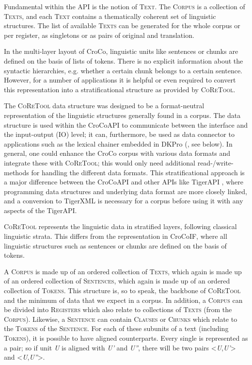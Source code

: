 \documentclass[output=paper]{LSP/langsci}
\begin{document}
Fundamental within the API is the notion of \textsc{Text}. The \textsc{Corpus} is a collection of \textsc{Texts}, and each \textsc{Text} contains a thematically coherent set of linguistic structures. The list of available \textsc{Texts} can be generated for the whole corpus or per register, as singletons or as pairs of original and translation.

In the multi-layer layout of CroCo, linguistic units like sentences or chunks are defined on the basis of lists of tokens. There is no explicit information about the syntactic hierarchies, e.g. whether a certain chunk belongs to a certain sentence. However, for a number of applications it is helpful or even required to convert this representation into a stratificational structure as provided by \textsc{CoReTool.}

The \textsc{CoReTool} data structure was designed to be a format-neutral representation of the linguistic structures generally found in a corpus. The data structure is used within the CroCoAPI to communicate between the interface and the input-output (IO) level; it can, furthermore, be used as data connector to applications such as the lexical chainer embedded in DKPro (\citealt{GurevychEtAl2007}, see below). In general, one could enhance the CroCo corpus with various data formats and integrate these with \textsc{CoReTool}; this would only need additional read-/write-methods for handling the different data formats. This stratificational approach is a major difference between the CroCoAPI and other APIs like TigerAPI \citep{Özgür2007}, where programming data structures and underlying data format are more closely linked, and a conversion to TigerXML is necessary for a corpus before using it with any aspects of the TigerAPI.

\textsc{CoReTool} represents the linguistic data in stratified layers, following classical linguistic strata. This differs from the representation in CroCoIF, where all linguistic structures such as sentences or chunks are defined on the basis of tokens. 

A \textsc{Corpus} is made up of an ordered collection of \textsc{Texts}, which again is made up of an ordered collection of \textsc{Sentences}, which again is made up of an ordered collection of \textsc{Tokens}. This structure is, so to speak, the backbone of \textsc{CoReTool} and the minimum of data that we expect in a corpus. In addition, a \textsc{Corpus} can be divided into \textsc{Registers} which also relate to collections of \textsc{Texts} (from the \textsc{Corpus}). Likewise, a \textsc{Sentence} can contain \textsc{Clauses} or \textsc{Chunks} which relate to the \textsc{Tokens} of the \textsc{Sentence}. For each of these subunits of a text (including \textsc{Tokens}), it is possible to have aligned counterparts. Every single  is represented as a pair; so if unit \textit{U} is aligned with \textit{U'} and \textit{U''}, there will be two pairs <\textit{U},\textit{U'}> and <\textit{U},\textit{U''}>.
\end{document}

